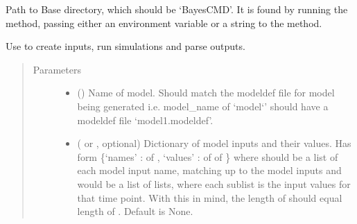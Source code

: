 \documentclass[letterpaper,10pt,english]{sphinxmanual}
\begin{document}

\begin{fulllineitems}
\label{\detokenize{bcmdModel:bayescmd.bcmdModel.bcmd_model.BASEDIR}}
 \textendash{} Path to Base directory, which should be ‘BayesCMD’. It is found by running
the {\hyperref[\detokenize{misc:bayescmd.util.findBaseDir}]{}} method, passing either an environment
variable or a string to the method.

\end{fulllineitems}


\begin{fulllineitems}
\label{\detokenize{bcmdModel:bayescmd.bcmdModel.ModelBCMD}}
Use to create inputs, run simulations and parse outputs.
\begin{quote}\begin{description}
\item[{Parameters}] \leavevmode\begin{itemize}
\item {} 
 () \textendash{} Name of model. Should match the modeldef file for model being generated
i.e. model\_name of ‘model{}`’ should have a modeldef file
‘model1.modeldef’.

\item {} 
 ( or , optional) \textendash{} Dictionary of model inputs and their values. Has form
\{‘names’ :  of ,
‘values’ :  of  of \}
where  should be a list of each model input name, matching up to
the model inputs and  would be a list of lists, where each
sublist is the input values for that time point. With this in mind,
the length of  should equal length of .
Default is None.


\end{itemize}
\end{description}
\end{quote}
\end{fulllineitems}
\end{document}
